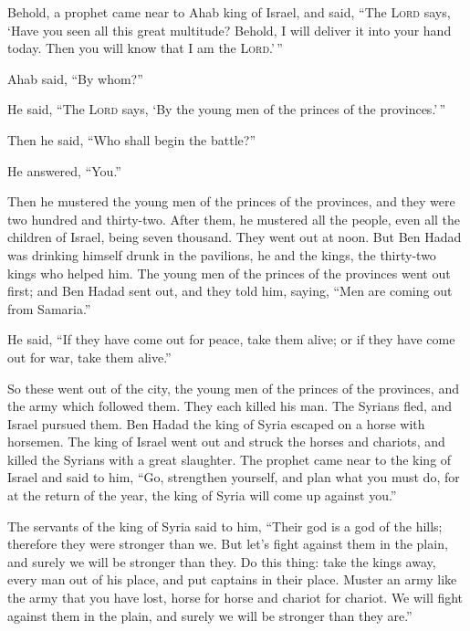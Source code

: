  Behold, a prophet came near to Ahab king of Israel, and
said, ``The \textsc{Lord} says, `Have you seen all this great multitude?
Behold, I will deliver it into your hand today. Then you will know that
I am the \textsc{Lord}.'\,''

 Ahab said, ``By whom?''

He said, ``The \textsc{Lord} says, `By the young men of the princes of
the provinces.'\,''

Then he said, ``Who shall begin the battle?''

He answered, ``You.''

 Then he mustered the young men of the princes of the
provinces, and they were two hundred and thirty-two. After them, he
mustered all the people, even all the children of Israel, being seven
thousand.  They went out at noon. But Ben Hadad was
drinking himself drunk in the pavilions, he and the kings, the
thirty-two kings who helped him.  The young men of the
princes of the provinces went out first; and Ben Hadad sent out, and
they told him, saying, ``Men are coming out from Samaria.''

 He said, ``If they have come out for peace, take them
alive; or if they have come out for war, take them alive.''

 So these went out of the city, the young men of the
princes of the provinces, and the army which followed them.
 They each killed his man. The Syrians fled, and Israel
pursued them. Ben Hadad the king of Syria escaped on a horse with
horsemen.  The king of Israel went out and struck the
horses and chariots, and killed the Syrians with a great slaughter.
 The prophet came near to the king of Israel and said to
him, ``Go, strengthen yourself, and plan what you must do, for at the
return of the year, the king of Syria will come up against you.''

 The servants of the king of Syria said to him, ``Their
god is a god of the hills; therefore they were stronger than we. But
let's fight against them in the plain, and surely we will be stronger
than they.  Do this thing: take the kings away, every man
out of his place, and put captains in their place. 
Muster an army like the army that you have lost, horse for horse and
chariot for chariot. We will fight against them in the plain, and surely
we will be stronger than they are.''

